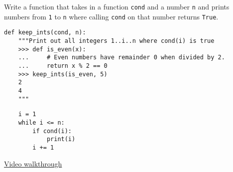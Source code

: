 \begin{blocksection}
\question Write a function that takes in a function \lstinline$cond$ and a
number \lstinline$n$ and prints numbers from \lstinline$1$ to
\lstinline$n$ where calling \lstinline$cond$ on that number returns
\lstinline$True$.

\begin{lstlisting}
def keep_ints(cond, n):
    """Print out all integers 1..i..n where cond(i) is true
    >>> def is_even(x):
    ...     # Even numbers have remainder 0 when divided by 2.
    ...     return x % 2 == 0
    >>> keep_ints(is_even, 5)
    2
    4
    """
\end{lstlisting}

\begin{solution}[1in]
\begin{lstlisting}
    i = 1
    while i <= n:
        if cond(i):
            print(i)
        i += 1
\end{lstlisting}
\href{https://www.youtube.com/watch?v=Fiw0f5yuQgo&vq=hd1080&t=72m24s}{Video walkthrough}
\end{solution}
\end{blocksection}
